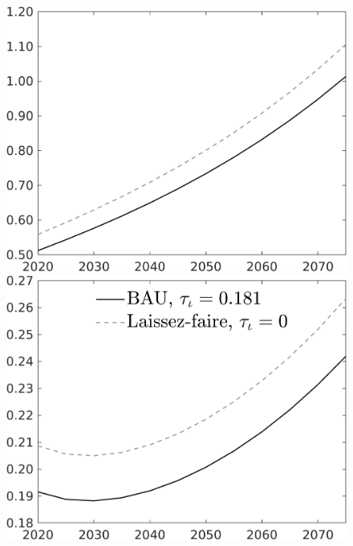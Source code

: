 \documentclass[12pt]{article}
\begin{document}
\begin{figure}[h!!]
\begin{minipage}[]{0.32\textwidth}
	\end{minipage}	
	\begin{minipage}[]{0.32\textwidth}
		\includegraphics[width=1\textwidth]{../../codding_model/own_basedOnFried/optimalPol_010922_revision/figures/all_13Sept22/CompTaul_Equlab_LFBAU_Reg0_C_spillover0_nsk0_xgr1_knspil0_sep1_countec0_GovRev0_etaa0.79_lgd0.png}
	\end{minipage}	
	\begin{minipage}[]{0.32\textwidth}
		\includegraphics[width=1\textwidth]{../../codding_model/own_basedOnFried/optimalPol_010922_revision/figures/all_13Sept22/CompTaul_Equlab_LFBAU_Reg0_F_spillover0_nsk0_xgr1_knspil0_sep1_countec0_GovRev0_etaa0.79_lgd1.png}

\end{minipage}
\end{figure}
\end{document}
